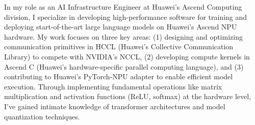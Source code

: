 \documentclass{article}
\begin{document}

In my role as an AI Infrastructure Engineer at Huawei's Ascend Computing division, I specialize in developing high-performance software for training and deploying start-of-the-art large language models on Huawei's Ascend NPU hardware. My work focuses on three key areas: (1) designing and optimizing communication primitives in HCCL (Huawei's Collective Communication Library) to compete with NVIDIA's NCCL, (2) developing compute kernels in Ascend C (Huawei's hardware-specific parallel computing language), and (3) contributing to Huawei's PyTorch-NPU adapter to enable efficient model execution. Through implementing fundamental operations like matrix multiplication and activation functions (ReLU, softmax) at the hardware level, I've gained intimate knowledge of transformer architectures and model quantization techniques.
\end{document}

